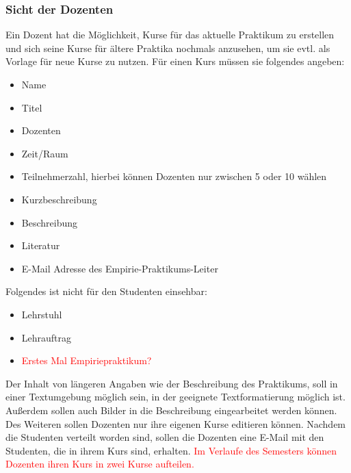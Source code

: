             \subsubsection{Sicht der Dozenten}
                Ein Dozent hat die Möglichkeit, Kurse für das aktuelle Praktikum zu erstellen und sich seine Kurse für ältere Praktika nochmals anzusehen, um sie evtl. als Vorlage für neue Kurse zu nutzen. 
                Für einen Kurs müssen sie folgendes angeben:
                \begin{itemize}
                    \item Name
                    \item Titel
                    \item Dozenten
                    \item Zeit/Raum
                    \item Teilnehmerzahl, hierbei können Dozenten nur zwischen 5 oder 10 wählen
                    \item Kurzbeschreibung
                    \item Beschreibung
                    \item Literatur
                    \item E-Mail Adresse des Empirie-Praktikums-Leiter %
                \end{itemize}
                Folgendes ist nicht für den Studenten einsehbar:
                \begin{itemize}
                    \item Lehrstuhl
                    \item Lehrauftrag
                    \item \textcolor{red}{Erstes Mal Empiriepraktikum?}
                \end{itemize}
                Der Inhalt von längeren Angaben wie der Beschreibung des Praktikums, soll in einer Textumgebung möglich sein, in der geeignete Textformatierung möglich ist.
                Außerdem sollen auch Bilder in die Beschreibung eingearbeitet werden können.
                Des Weiteren sollen Dozenten nur ihre eigenen Kurse editieren können.
                Nachdem die Studenten verteilt worden sind, sollen die Dozenten eine E-Mail mit den Studenten, die in ihrem Kurs sind, erhalten.
                \textcolor{red}{Im Verlaufe des Semesters können Dozenten ihren Kurs in zwei Kurse aufteilen.}
    
